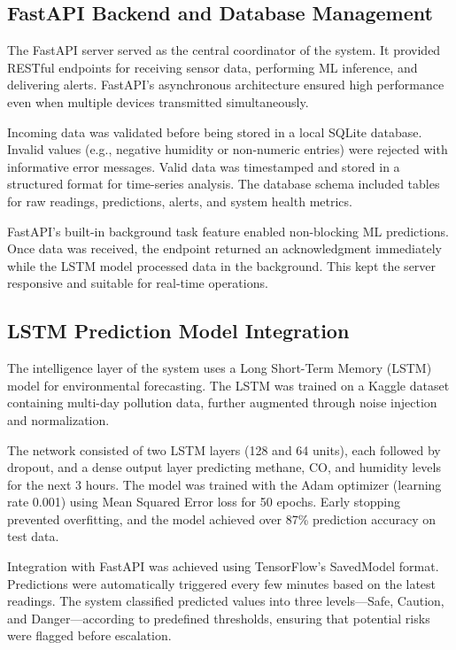 \subsection{FastAPI Backend and Database Management}
\label{subsec:fastapi_backend}

The FastAPI server served as the central coordinator of the system. It provided RESTful endpoints for receiving sensor data, performing ML inference, and delivering alerts. FastAPI’s asynchronous architecture ensured high performance even when multiple devices transmitted simultaneously.

Incoming data was validated before being stored in a local SQLite database. Invalid values (e.g., negative humidity or non-numeric entries) were rejected with informative error messages. Valid data was timestamped and stored in a structured format for time-series analysis. The database schema included tables for raw readings, predictions, alerts, and system health metrics.

FastAPI’s built-in background task feature enabled non-blocking ML predictions. Once data was received, the endpoint returned an acknowledgment immediately while the LSTM model processed data in the background. This kept the server responsive and suitable for real-time operations.

\subsection{LSTM Prediction Model Integration}
\label{subsec:lstm_model}

The intelligence layer of the system uses a Long Short-Term Memory (LSTM) model for environmental forecasting. The LSTM was trained on a Kaggle dataset containing multi-day pollution data, further augmented through noise injection and normalization.

The network consisted of two LSTM layers (128 and 64 units), each followed by dropout, and a dense output layer predicting methane, CO, and humidity levels for the next 3 hours. The model was trained with the Adam optimizer (learning rate 0.001) using Mean Squared Error loss for 50 epochs. Early stopping prevented overfitting, and the model achieved over 87\% prediction accuracy on test data.

Integration with FastAPI was achieved using TensorFlow’s SavedModel format. Predictions were automatically triggered every few minutes based on the latest readings. The system classified predicted values into three levels—Safe, Caution, and Danger—according to predefined thresholds, ensuring that potential risks were flagged before escalation.

